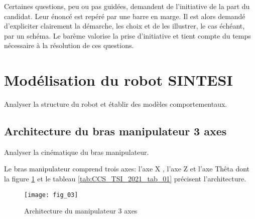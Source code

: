Certaines questions, peu ou pas guidées, demandent de l'initiative de la part du candidat. Leur énoncé est repéré par une barre en marge. Il est alors demandé d'expliciter clairement la démarche, les choix et de les illustrer, le cas échéant, par un schéma. Le barème valorise la prise d'initiative et tient compte du temps nécessaire à la résolution de ces questions.

\section{Modélisation du robot SINTESI}
\begin{obj}
Analyser la structure du robot et établir des modèles comportementaux.
\end{obj}

\subsection{Architecture du bras manipulateur 3 axes}
\begin{obj}
Analyser la cinématique du bras manipulateur.
\end{obj}


Le bras manipulateur comprend trois axes: l'axe X , l'axe Z et l'axe Thêta dont la figure \ref{fig:CCS_TSI_2021_fig_03} et le tableau \ref{tab:CCS_TSI_2021_tab_01} précisent l'architecture.
\begin{figure}
\centering
\texttt{[image: fig\_03]}

\caption{\label{fig:CCS_TSI_2021_fig_03} Architecture du manipulateur 3 axes}
\end{figure}

